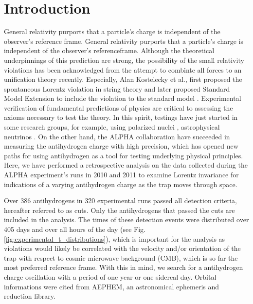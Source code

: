 \documentclass[superscriptaddress,aps,prb,11pt]{revtex4-1}
\begin{document}
\section{Introduction}
General relativity purports that a particle's charge is independent of the observer's reference frame.  General relativity purports that a particle's charge is independent of the observer's referenceframe. Although the theoretical underpinnings of this prediction are strong, the possibility of the small relativity violations has been acknowledged from the attempt to combinte all forces to an unification theory recently. Especially, Alan Kostelecky et al., first proposed the spontaneous Lorentz violation in string theory \cite{kostelecky1989spontaneous} and later proposed Standard Model Extension to include the violation to the standard model \cite{colladay1998lorentz}. Experimental verification of fundamental predictions of physics are critical to assessing the axioms necessary to test the theory. In this spirit, testings have just started in some research groups, for example, using polarized nuclei \cite{muller2013first}, astrophysical neutrinos \cite{diaz2014testing}. On the other hand, the ALPHA collaboration have succeeded in measuring the antihydrogen charge with high precision\cite{amol:14a}, which has opened new paths for using antihydrogen as a tool for testing underlying physical principles.  Here, we have performed a retrospective analysis on the data collected during the ALPHA experiment's runs in 2010 and 2011 to examine Lorentz invariance for indications of a varying antihydrogen charge as the trap moves through space.

Over 386 antihydrogens in 320 experimental runs passed all detection criteria, hereafter referred to as cuts\cite{amol:14a}.  Only the antihydrogens that passed the cuts are included in the analysis.  The times of these detection events were distributed over 405 days and over all hours of the day (see Fig.\ref{fig:experimental_t_distributions}), which is important for the analysis as violations would likely be correlated with the velocity and/or orientation of the trap with respect to cosmic microwave background (CMB), which is so far the most preferred reference frame. With this in mind, we search for a antihydrogen charge oscillation with a period of one year or one sidereal day. Orbital informations were cited from AEPHEM\cite{aephem}, an astronomical ephemeris and reduction library.
\end{document}
